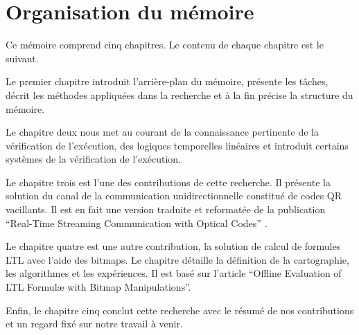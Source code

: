 \section{Organisation du mémoire}

Ce mémoire comprend cinq chapitres. Le contenu de chaque chapitre est le suivant.

Le premier chapitre introduit l'arrière-plan du mémoire, présente les tâches, décrit les méthodes appliquées dans la recherche et à la fin précise la structure du mémoire.

Le chapitre deux nous met au courant de la connaissance pertinente de la vérification de l'exécution, des logiques temporelles linéaires et introduit certains systèmes de la vérification de l'exécution.

Le chapitre trois est l'une des contributions de cette recherche. Il présente la solution du canal de la communication unidirectionnelle constitué de codes QR vacillants. Il est en fait une version traduite et reformatée de la publication ``Real-Time Streaming Communication with Optical Codes'' \citep{kxie7370891}.

Le chapitre quatre est une autre contribution, la solution de calcul de formules LTL avec l'aide des bitmaps. Le chapitre détaille la définition de la cartographie, les algorithmes et les expériences. Il est basé sur l'article ``Offline Evaluation of LTL Formul\ae{} with Bitmap Manipulations''.

Enfin, le chapitre cinq conclut cette recherche avec le résumé de nos contributions et un regard fixé sur notre travail à venir.